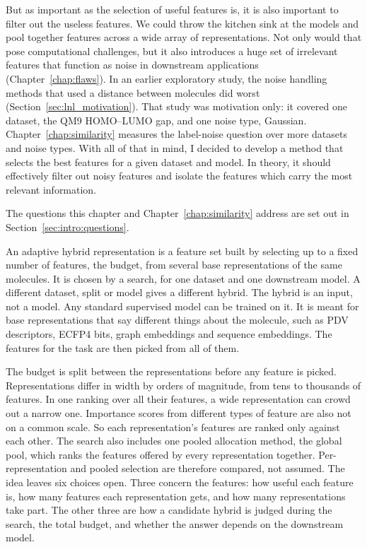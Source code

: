 But as important as the selection of useful features is, it is also important to filter out the useless features. We could throw the kitchen sink at the models and pool together features across a wide array of representations. Not only would that pose computational challenges, but it also introduces a huge set of irrelevant features that function as noise in downstream applications (Chapter~\ref{chap:flaws}). In an earlier exploratory study, the noise handling methods that used a distance between molecules did worst (Section~\ref{sec:lnl_motivation}). That study was motivation only: it covered one dataset, the QM9 HOMO--LUMO gap, and one noise type, Gaussian. Chapter~\ref{chap:similarity} measures the label-noise question over more datasets and noise types. With all of that in mind, I decided to develop a method that selects the best features for a given dataset and model. In theory, it should effectively filter out noisy features and isolate the features which carry the most relevant information.

The questions this chapter and Chapter~\ref{chap:similarity} address are set out in Section~\ref{sec:intro:questions}.

An adaptive hybrid representation is a feature set built by selecting up to a fixed number of features, the budget, from several base representations of the same molecules. It is chosen by a search, for one dataset and one downstream model. A different dataset, split or model gives a different hybrid. The hybrid is an input, not a model. Any standard supervised model can be trained on it. It is meant for base representations that say different things about the molecule, such as PDV descriptors, ECFP4 bits, graph embeddings and sequence embeddings. The features for the task are then picked from all of them.

The budget is split between the representations before any feature is picked. Representations differ in width by orders of magnitude, from tens to thousands of features. In one ranking over all their features, a wide representation can crowd out a narrow one. Importance scores from different types of feature are also not on a common scale. So each representation's features are ranked only against each other. The search also includes one pooled allocation method, the global pool, which ranks the features offered by every representation together. Per-representation and pooled selection are therefore compared, not assumed. The idea leaves six choices open. Three concern the features: how useful each feature is, how many features each representation gets, and how many representations take part. The other three are how a candidate hybrid is judged during the search, the total budget, and whether the answer depends on the downstream model.

